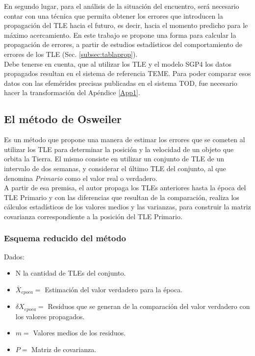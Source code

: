 En segundo lugar, para el an\'alisis de la situaci\'on del encuentro, ser\'a necesario contar con una t\'ecnica que permita obtener los errores que introducen la propagaci\'on del TLE hacia el futuro, es decir, hacia el momento predicho para le m\'aximo acercamiento. En este trabajo se propone una forma para calcular la propagaci\'on de errores, a partir de estudios estad\'isticos del comportamiento de errores de los TLE (Sec. \ref{subsec:tablaprop}).\\

Debe tenerse en cuenta, que al utilizar los TLE y el modelo SGP4  los datos propagados resultan en el sistema de referencia \ac{TEME}. Para poder comparar esos datos con las efem\'erides precisas publicadas en el sistema TOD, fue necesario hacer la transformaci\'on del Ap\'endice \ref{App1}.\\

\subsection{ El m\'etodo de Osweiler}\label{subsec:osw}
Es un m\'etodo que propone una manera de estimar los errores que se cometen al utilizar los TLE para determinar la posici\'on y la velocidad de un objeto que orbita la Tierra.
El mismo consiste en utilizar un conjunto de TLE de un intervalo de dos semanas, y considerar el \'ultimo TLE del conjunto, al que denomina {\it{Primario}} como el valor real o verdadero.\\
A partir de esa premisa, el autor propaga los TLEs anteriores hasta la \'epoca del TLE Primario y con las diferencias que resultan de la comparaci\'on, realiza los c\'alculos estad\'isticos de los valores medios y las varianzas, para construir la matriz covarianza correspondiente a la posici\'on del TLE Primario.\\

\subsubsection*{Esquema reducido del m\'etodo}

Dados:
\begin{itemize}
\itemsep0em
 \item N la cantidad de TLEs del conjunto.
 \item $\bar{X}_{epoca} = $  Estimaci\'on del valor verdadero para la \'epoca.
 \item $\delta X_{epoca} = $ Residuos que se generan de la comparaci\'on del valor verdadero con los valores propagados.
 \item $m = $ Valores medios de los residuos.
 \item $P = $ Matriz de covarianza.
\end{itemize}

